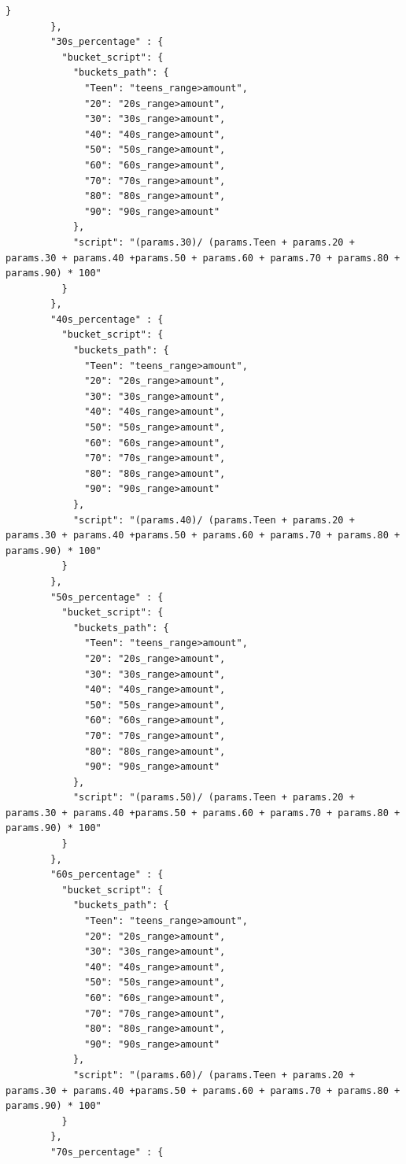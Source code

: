 \documentclass{article}
\begin{document}
\begin{lstlisting}[language=cypher, label=lst:cypher-example]
          }
        },
        "30s_percentage" : {
          "bucket_script": {
            "buckets_path": {
              "Teen": "teens_range>amount",
              "20": "20s_range>amount",
              "30": "30s_range>amount",
              "40": "40s_range>amount",
              "50": "50s_range>amount",
              "60": "60s_range>amount",
              "70": "70s_range>amount",
              "80": "80s_range>amount",
              "90": "90s_range>amount"
            },
            "script": "(params.30)/ (params.Teen + params.20 + params.30 + params.40 +params.50 + params.60 + params.70 + params.80 + params.90) * 100"
          }
        },
        "40s_percentage" : {
          "bucket_script": {
            "buckets_path": {
              "Teen": "teens_range>amount",
              "20": "20s_range>amount",
              "30": "30s_range>amount",
              "40": "40s_range>amount",
              "50": "50s_range>amount",
              "60": "60s_range>amount",
              "70": "70s_range>amount",
              "80": "80s_range>amount",
              "90": "90s_range>amount"
            },
            "script": "(params.40)/ (params.Teen + params.20 + params.30 + params.40 +params.50 + params.60 + params.70 + params.80 + params.90) * 100"
          }
        },
        "50s_percentage" : {
          "bucket_script": {
            "buckets_path": {
              "Teen": "teens_range>amount",
              "20": "20s_range>amount",
              "30": "30s_range>amount",
              "40": "40s_range>amount",
              "50": "50s_range>amount",
              "60": "60s_range>amount",
              "70": "70s_range>amount",
              "80": "80s_range>amount",
              "90": "90s_range>amount"
            },
            "script": "(params.50)/ (params.Teen + params.20 + params.30 + params.40 +params.50 + params.60 + params.70 + params.80 + params.90) * 100"
          }
        },
        "60s_percentage" : {
          "bucket_script": {
            "buckets_path": {
              "Teen": "teens_range>amount",
              "20": "20s_range>amount",
              "30": "30s_range>amount",
              "40": "40s_range>amount",
              "50": "50s_range>amount",
              "60": "60s_range>amount",
              "70": "70s_range>amount",
              "80": "80s_range>amount",
              "90": "90s_range>amount"
            },
            "script": "(params.60)/ (params.Teen + params.20 + params.30 + params.40 +params.50 + params.60 + params.70 + params.80 + params.90) * 100"
          }
        },
        "70s_percentage" : {

\end{lstlisting}
\end{document}

